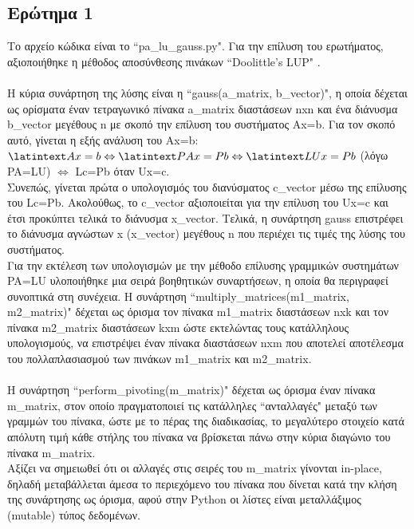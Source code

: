 \documentclass[a4paper,11pt]{article}
\newcommand{\lt}{\latintext}
\begin{document}
\subsection*{Ερώτημα 1}
Το αρχείο κώδικα είναι το {\lt ``pa\_lu\_gauss.py"}. 
Για την επίλυση του ερωτήματος, αξιοποιήθηκε η μέθοδος αποσύνθεσης πινάκων {\lt ``Doolittle's LUP" }.\\
\\Η κύρια συνάρτηση της λύσης είναι η {\lt ``gauss(a\_matrix, b\_vector)"}, η οποία δέχεται ως ορίσματα έναν τετραγωνικό πίνακα {\lt a\_matrix} διαστάσεων {\lt nxn} και ένα διάνυσμα {\lt b\_vector} μεγέθους {\lt n} με σκοπό την επίλυση του συστήματος {\lt Ax=b}. Για τον σκοπό αυτό, γίνεται η εξής ανάλυση του {\lt Ax=b}:\\
{${\lt Ax=b} \Leftrightarrow  {\lt PAx=Pb} \Leftrightarrow {\lt LUx=Pb}$} (λόγω {\lt PA=LU}) {$ \Leftrightarrow$} {\lt Lc=Pb} όταν {\lt Ux=c}.\\
Συνεπώς, γίνεται πρώτα ο υπολογισμός του διανύσματος {\lt c\_vector} μέσω της επίλυσης του {\lt Lc=Pb}. Ακολούθως, το {\lt c\_vector} αξιοποιείται για την επίλυση του {\lt Ux=c} και έτσι προκύπτει τελικά το διάνυσμα {\lt x\_vector}.
Τελικά, η συνάρτηση {\lt gauss} επιστρέφει το διάνυσμα αγνώστων {\lt x} {\lt (x\_vector)} μεγέθους {\lt n} που περιέχει τις τιμές της λύσης του συστήματος.\\
Για την εκτέλεση των υπολογισμών με την μέθοδο επίλυσης γραμμικών συστημάτων {\lt PA=LU} υλοποιήθηκε μια σειρά βοηθητικών συναρτήσεων, η οποία θα περιγραφεί συνοπτικά στη συνέχεια. 
Η συνάρτηση {\lt ``multiply\_matrices(m1\_matrix, m2\_matrix)"} δέχεται ως όρισμα τον πίνακα {\lt m1\_matrix} διαστάσεων {\lt nxk} και τον πίνακα {\lt m2\_matrix} διαστάσεων {\lt kxm} ώστε εκτελώντας τους κατάλληλους υπολογισμούς, να επιστρέψει έναν πίνακα διαστάσεων {\lt nxm} που αποτελεί αποτέλεσμα του πολλαπλασιασμού των πινάκων {\lt m1\_matrix} και {\lt m2\_matrix}.\\
\\H συνάρτηση {\lt ``perform\_pivoting(m\_matrix)"} δέχεται ως όρισμα έναν πίνακα {\lt m\_matrix}, στον οποίο πραγματοποιεί τις κατάλληλες ``ανταλλαγές" μεταξύ των γραμμών του πίνακα, ώστε με το πέρας της διαδικασίας,  το μεγαλύτερο στοιχείο κατά απόλυτη τιμή κάθε στήλης του πίνακα να βρίσκεται πάνω στην κύρια διαγώνιο του πίνακα {\lt m\_matrix}. \\Αξίζει να σημειωθεί ότι οι αλλαγές στις σειρές του {\lt m\_matrix} γίνονται {\lt in-place},
δηλαδή μεταβάλλεται άμεσα το περιεχόμενο του πίνακα που δίνεται κατά την κλήση της συνάρτησης ως όρισμα, αφού στην {\lt Python} οι λίστες είναι μεταλλάξιμος {\lt (mutable)} τύπος δεδομένων.\\
\end{document}
